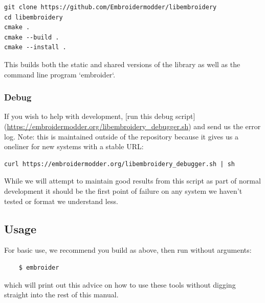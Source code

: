 \documentclass[a4paper, 11pt]{report}
\begin{document}
\begin{verbatim}
git clone https://github.com/Embroidermodder/libembroidery
cd libembroidery
cmake .
cmake --build .
cmake --install .
\end{verbatim}

This builds both the static and shared versions of the library as well
as the command line program `embroider`.

\subsubsection{Debug}

If you wish to help with development, [run this debug script](\url{https://embroidermodder.org/libembroidery_debugger.sh}) and send us the error log. Note: this is maintained outside of the repository because it gives us a oneliner for new systems with a stable URL:

\begin{verbatim}
curl https://embroidermodder.org/libembroidery_debugger.sh | sh
\end{verbatim}

While we will attempt to maintain good results from this script as part of normal development it should be the first point of failure on any system we haven't tested or format we understand less.

\subsection{Usage}

For basic use, we recommend you build as above, then run without arguments:

\begin{verbatim}
    $ embroider
\end{verbatim}

which will print out this advice on how to use these tools without digging straight into the rest of this manual.
\end{document}
